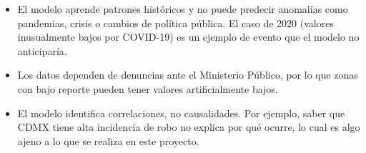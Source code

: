 \begin{itemize}
  \item El modelo aprende patrones históricos y no puede predecir anomalías como pandemias, crisis o cambios de
  política pública. El caso de 2020 (valores inusualmente bajos por COVID-19) es un ejemplo de evento que
  el modelo no anticiparía.
  \item Los datos dependen de denuncias ante el Ministerio Público, por lo que zonas con bajo reporte pueden tener
  valores artificialmente bajos.
  \item El modelo identifica correlaciones, no causalidades. Por ejemplo, saber que CDMX tiene alta incidencia
  de robo no explica por qué ocurre, lo cual es algo ajeno a lo que se realiza en este proyecto.
\end{itemize}
